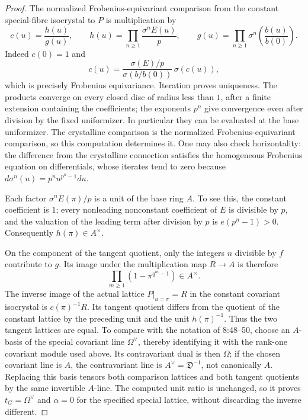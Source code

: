 \begin{proof}
The normalized Frobenius-equivariant comparison from the constant special-fibre isocrystal to $P$ is multiplication by
\[
 c(u)=\frac{h(u)}{g(u)},\qquad
 h(u)=\prod_{n\geq1}\frac{\sigma^n E(u)}p,
 \qquad
 g(u)=\prod_{n\geq1}\sigma^n\left(\frac{b(u)}{b(0)}\right).
\]
Indeed $c(0)=1$ and
\[
 c(u)=\frac{\sigma(E)/p}{\sigma(b/b(0))}\,\sigma(c(u)),
\]
which is precisely Frobenius equivariance.  Iteration proves uniqueness.  The products converge on every closed disc of radius less than $1$, after a finite extension containing the coefficients; the exponents $p^n$ give convergence even after division by the fixed uniformizer.  In particular they can be evaluated at the base uniformizer.  The crystalline comparison is the normalized Frobenius-equivariant comparison, so this computation determines it.  One may also check horizontality: the difference from the crystalline connection satisfies the homogeneous Frobenius equation on differentials, whose iterates tend to zero because $d\sigma^n(u)=p^n u^{p^n-1}du$.

Each factor $\sigma^nE(\pi)/p$ is a unit of the base ring $A$.  To see this, the constant coefficient is $1$; every nonleading nonconstant coefficient of $E$ is divisible by $p$, and the valuation of the leading term after division by $p$ is $e(p^n-1)>0$.  Consequently $h(\pi)\in A^\times$.

On the component of the tangent quotient, only the integers $n$ divisible by $f$ contribute to $g$.  Its image under the multiplication map $R\to A$ is therefore
\[
                  \prod_{m\geq1}(1-\pi^{q^m-1})\in A^\times.
\]
The inverse image of the actual lattice $P|_{u=\pi}=R$ in the constant covariant isocrystal is $c(\pi)^{-1}R$.  Its tangent quotient differs from the quotient of the constant lattice by the preceding unit and the unit $h(\pi)^{-1}$.  Thus the two tangent lattices are equal.  To compare with the notation of 8:48--50, choose an $A$-basis of the special covariant line $\Omega^\vee$, thereby identifying it with the rank-one covariant module used above.  Its contravariant dual is then $\Omega$; if the chosen covariant line is $A$, the contravariant line is $A^\vee=\mathfrak D^{-1}$, not canonically $A$.  Replacing this basis tensors both comparison lattices and both tangent quotients by the same invertible $A$-line.  The computed unit ratio is unchanged, so it proves $t_G=\Omega^\vee$ and $\alpha=0$ for the specified special lattice, without discarding the inverse different.


\end{proof}
